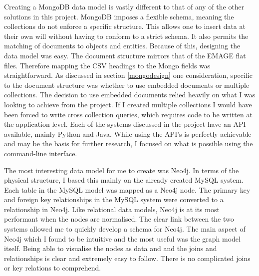 Creating a MongoDB data model is vastly different to that of any of the other solutions in this project. MongoDB imposes a flexible schema, meaning the collections do not enforce a specific structure. This allows one to insert data at their own will without having to conform to a strict schema. It also permits the matching of documents to objects and entities. Because of this, designing the data model was easy. The document structure mirrors that of the EMAGE flat files. Therefore mapping the CSV headings to the Mongo fields was straightforward. As discussed in section \ref{mongodesign} one consideration, specific to the document structure was whether to use embedded documents or multiple collections. The decision to use embedded documents relied heavily on what I was looking to achieve from the project. If I created multiple collections I would have been forced to write cross collection queries, which requires code to be written at the application level. Each of the systems discussed in the project have an API available, mainly Python and Java. While using the API's is perfectly achievable and may be the basis for further research, I focused on what is possible using the command-line interface. 

The most interesting data model for me to create was Neo4j. In terms of the physical structure, I based this mainly on the already created MySQL system. Each table in the MySQL model was mapped as a Neo4j node. The primary key and foreign key relationships in the MySQL system were converted to a relationship in Neo4j. Like relational data models, Neo4j is at its most performant when the nodes are normalised. The clear link between the two systems allowed me to quickly develop a schema for Neo4j. The main aspect of Neo4j which I found to be intuitive and the most useful was the graph model itself. Being able to visualise the nodes as data and and the joins and relationships is clear and extremely easy to follow. There is no complicated joins or key relations to comprehend.

